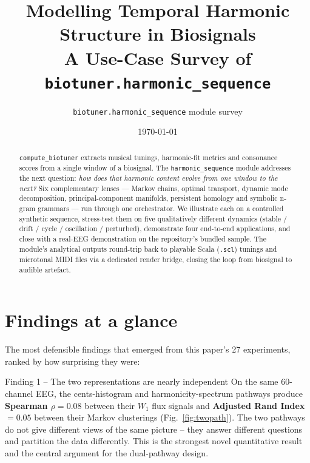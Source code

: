 \documentclass[11pt,a4paper]{article}
\title{\Large\bfseries
       Modelling Temporal Harmonic Structure in Biosignals \\[0.4em]
       \large A Use-Case Survey of \texttt{biotuner.harmonic\_sequence}}
\author{\texttt{biotuner.harmonic\_sequence} \quad \small{module survey}}
\date{\today}
\begin{document}
\maketitle

\begin{abstract}
\noindent
\texttt{compute\_biotuner} extracts musical tunings, harmonic-fit metrics
and consonance scores from a single window of a biosignal. The
\texttt{harmonic\_sequence} module addresses the next question:
\emph{how does that harmonic content evolve from one window to the next?}
Six complementary lenses --- Markov chains, optimal transport, dynamic
mode decomposition, principal-component manifolds, persistent homology
and symbolic n-gram grammars --- run through one orchestrator. We
illustrate each on a controlled synthetic sequence, stress-test them on
five qualitatively different dynamics (stable / drift / cycle /
oscillation / perturbed), demonstrate four end-to-end applications, and
close with a real-EEG demonstration on the repository's bundled sample.
The module's analytical outputs round-trip back to playable Scala
(\texttt{.scl}) tunings and microtonal MIDI files via a dedicated render
bridge, closing the loop from biosignal to audible artefact.
\end{abstract}

\tableofcontents
\bigskip

\section*{Findings at a glance}

The most defensible findings that emerged from this paper's 27
experiments, ranked by how surprising they were:

\begin{headlinebox}{Finding 1 -- The two representations are nearly independent}
On the same 60-channel EEG, the cents-histogram and
harmonicity-spectrum pathways produce \textbf{Spearman $\rho=0.08$}
between their $W_1$ flux signals and \textbf{Adjusted Rand Index
$= 0.05$} between their Markov clusterings (Fig.~\ref{fig:twopath}).
The two pathways do not give different views of the same picture --
they answer different questions and partition the data differently.
This is the strongest novel quantitative result and the central
argument for the dual-pathway design.
\end{headlinebox}
\end{document}
